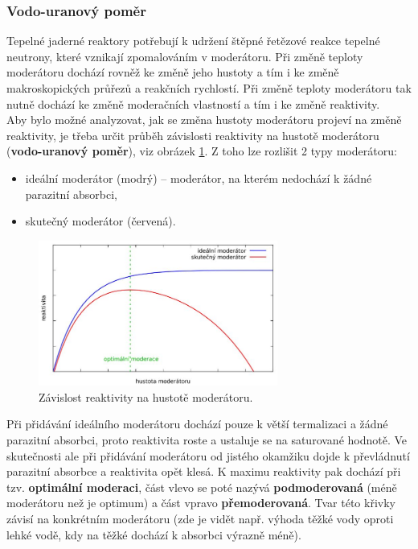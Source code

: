 \subsubsection{Vodo-uranový poměr}

Tepelné jaderné reaktory potřebují k udržení štěpné řetězové reakce tepelné neutrony, které vznikají zpomalováním v moderátoru. Při změně teploty moderátoru dochází rovněž ke změně jeho hustoty a tím i ke změně makroskopických průřezů a reakčních rychlostí. Při změně teploty moderátoru tak nutně dochází ke změně moderačních vlastností a tím i ke změně reaktivity.\\

Aby bylo možné analyzovat, jak se změna hustoty moderátoru projeví na změně reaktivity, je třeba určit průběh závislosti reaktivity na hustotě moderátoru (\textbf{vodo-uranový poměr}), viz obrázek \ref{voda-uran}. Z toho lze rozlišit 2 typy moderátoru:

\begin{itemize}
  \item ideální moderátor (modrý) -- moderátor, na kterém nedochází k žádné parazitní absorbci,
  \item skutečný moderátor (červená).
\end{itemize}

\begin{figure}[H]
  \centering
  \includegraphics[width=0.7\textwidth]{img/voda-uran.JPG}
  \caption{Závislost reaktivity na hustotě moderátoru.}
  \label{voda-uran}
\end{figure}

Při přidávání ideálního moderátoru dochází pouze k větší termalizaci a žádné parazitní absorbci, proto reaktivita roste a ustaluje se na saturované hodnotě. Ve skutečnosti ale při přidávání moderátoru od jistého okamžiku dojde k převládnutí parazitní absorbce a reaktivita opět klesá. K maximu reaktivity pak dochází při tzv. \textbf{optimální moderaci}, část vlevo se poté nazývá \textbf{podmoderovaná} (méně moderátoru než je optimum) a část vpravo \textbf{přemoderovaná}. Tvar této křivky závisí na konkrétním moderátoru (zde je vidět např. výhoda těžké vody oproti lehké vodě, kdy na těžké dochází k absorbci výrazně méně).\\

